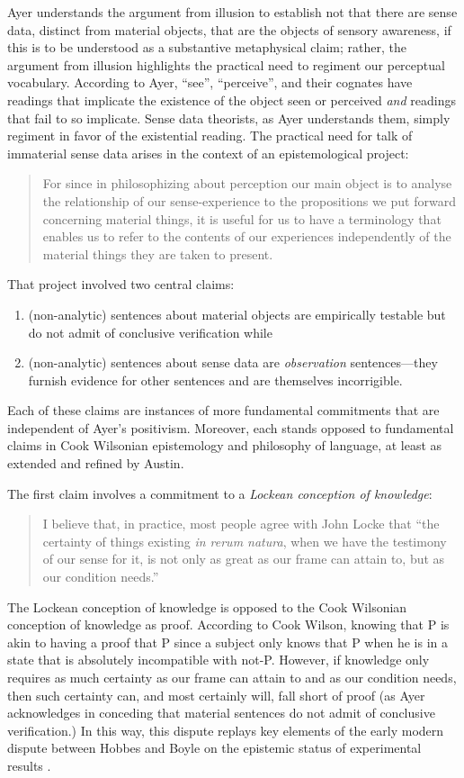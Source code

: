 \documentclass[11pt]{article}
\begin{document}
Ayer understands the argument from illusion to establish not that there are sense data, distinct from material objects, that are the objects of sensory awareness, if this is to be understood as a substantive metaphysical claim; rather, the argument from illusion highlights the practical need to regiment our perceptual vocabulary. According to Ayer, ``see'', ``perceive'', and their cognates have readings that implicate the existence of the object seen or perceived \emph{and} readings that fail to so implicate. Sense data theorists, as Ayer understands them, simply regiment in favor of the existential reading. The practical need for talk of immaterial sense data arises in the context of an epistemological project:
\begin{quote}
    For since in philosophizing about perception our main object is to analyse the relationship of our sense-experience to the propositions we put forward concerning material things, it is useful for us to have a terminology that enables us to refer to the contents of our experiences independently of the material things they are taken to present. \citep[]{Ayer:1958kx}
\end{quote}

That project involved two central claims:
\begin{enumerate}
	\item (non-analytic) sentences about material objects are empirically testable but do not admit of conclusive verification while 
	\item (non-analytic) sentences about sense data are \emph{observation} sentences---\-they furnish evidence for other sentences and are themselves incorrigible. 
\end{enumerate}
Each of these claims are instances of more fundamental commitments that are independent of Ayer's positivism. Moreover, each stands opposed to fundamental claims in Cook Wilsonian epistemology and philosophy of language, at least as extended and refined by Austin.

The first claim involves a commitment to a \emph{Lockean conception of knowledge}:
\begin{quote}
    I believe that, in practice, most people agree with John Locke that ``the certainty of things existing \emph{in rerum natura}, when we have the testimony of our sense for it, is not only as great as our frame can attain to, but as our condition needs.'' \citep[1]{Ayer:1958kx}
\end{quote}
The Lockean conception of knowledge is opposed to the Cook Wilsonian conception of knowledge as proof. According to Cook Wilson, knowing that P is akin to having a proof that P since a subject only knows that P when he is in a state that is absolutely incompatible with not-P. However, if knowledge only requires as much certainty as our frame can attain to and as our condition needs, then such certainty can, and most certainly will, fall short of proof (as Ayer acknowledges in conceding that material sentences do not admit of conclusive verification.) In this way, this dispute replays key elements of the early modern dispute between Hobbes and Boyle on the epistemic status of experimental results \citep[see][for discussion]{Shapin:1985ad}.
\end{document}
